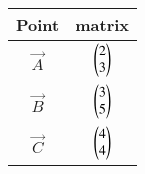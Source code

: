 \begin{tabular}{|c|c|}
\hline
\textbf{Point} & \textbf{matrix} \\
\hline
$\vec{A}$ & $\begin{pmatrix}2\\3\end{pmatrix}$ \\
\hline
$\vec{B}$ & $\begin{pmatrix}3\\5\end{pmatrix}$ \\
\hline
$\vec{C}$ & $\begin{pmatrix}4\\4\end{pmatrix}$ \\
\hline
\end{tabular}
